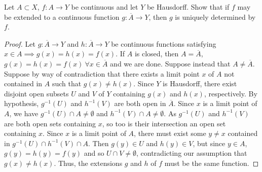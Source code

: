 \begin{exercise}[ID=2.18.13]
    Let $A \subset X$, $f: A \rightarrow Y$ be continuous and let $Y$ be Hausdorff.
    Show that if $f$ may be extended to a continuous function $g: \overline{A} \rightarrow Y$, then $g$ is uniquely determined by $f$.
\end{exercise}

\begin{solution}
    \begin{proof}
        Let $g: \overline{A} \rightarrow Y$ and $h: \overline{A} \rightarrow Y$ be continuous functions satisfying $x \in A \implies g(x) = h(x) = f(x)$.
        If $A$ is closed, then $A = \overline{A}$, $g(x) = h(x) = f(x)~ \forall x \in \overline{A}$ and we are done.
        Suppose instead that $A \neq \overline{A}$.
        Suppose by way of contradiction that there exists a limit point $x$ of $A$ not contained in $A$ such that $g(x) \neq h(x)$.
        Since $Y$ is Hausdorff, there exist disjoint open subsets $U$ and $V$ of $Y$ containing $g(x)$ and $h(x)$, respectively.
        By hypothesis, $g^{-1}(U)$ and $h^{-1}(V)$ are both open in $\overline{A}$.
        Since $x$ is a limit point of $A$, we have $g^{-1}(U) \cap A \neq \emptyset$ and $h^{-1}(V) \cap A \neq \emptyset$.
        As $g^{-1}(U)$ and $h^{-1}(V)$ are both open sets containing $x$, so too is their intersection an open set containing $x$.
        Since $x$ is a limit point of $A$, there must exist some $y \neq x$ contained in $g^{-1}(U) \cap h^{-1}(V) \cap A$.
        Then $g(y) \in U$ and $h(y) \in V$, but since $y \in A$, $g(y) = h(y) = f(y)$ and so $U \cap V \neq \emptyset$, contradicting our assumption that $g(x) \neq h(x)$.
        Thus, the extensions $g$ and $h$ of $f$ must be the same function.
    \end{proof}
\end{solution}
\newpage

